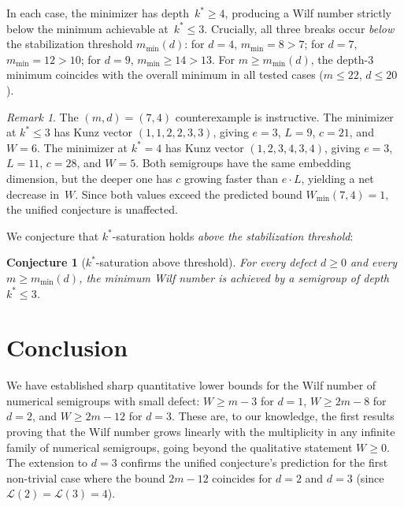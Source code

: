 \documentclass[11pt]{amsart}
\newtheorem{conjecture}[theorem]{Conjecture}
\theoremstyle{definition}
\theoremstyle{remark}
\newtheorem{remark}[theorem]{Remark}
\begin{document}
In each case, the minimizer has depth~$k^* \ge 4$, producing a Wilf number
strictly below the minimum achievable at~$k^* \le 3$.
Crucially, all three breaks occur \emph{below} the stabilization threshold
$m_{\min}(d)$: for $d = 4$, $m_{\min} = 8 > 7$; for $d = 7$,
$m_{\min} = 12 > 10$; for $d = 9$, $m_{\min} \ge 14 > 13$.
For $m \ge m_{\min}(d)$, the depth-$3$ minimum coincides with the overall
minimum in all tested cases ($m \le 22$, $d \le 20$).

\begin{remark}
The $(m,d) = (7,4)$ counterexample is instructive.
The minimizer at $k^* \le 3$ has Kunz vector $(1,1,2,2,3,3)$,
giving $e = 3$, $L = 9$, $c = 21$, and $W = 6$.
The minimizer at $k^* = 4$ has Kunz vector $(1,2,3,4,3,4)$,
giving $e = 3$, $L = 11$, $c = 28$, and $W = 5$.
Both semigroups have the same embedding dimension,
but the deeper one has $c$ growing faster than $e \cdot L$,
yielding a net decrease in~$W$.
Since both values exceed the predicted bound $W_{\min}(7,4) = 1$,
the unified conjecture is unaffected.
\end{remark}

We conjecture that $k^*$-saturation holds \emph{above the stabilization threshold}:

\begin{conjecture}[$k^*$-saturation above threshold]\label{conj:sat}
For every defect $d \ge 0$ and every $m \ge m_{\min}(d)$,
the minimum Wilf number is achieved by a semigroup of depth~$k^* \le 3$.
\end{conjecture}

\section{Conclusion}\label{sec:conclusion}

We have established sharp quantitative lower bounds for the Wilf number
of numerical semigroups with small defect:
$W \ge m - 3$ for $d = 1$, $W \ge 2m - 8$ for $d = 2$,
and $W \ge 2m - 12$ for $d = 3$.
These are, to our knowledge, the first results proving that the Wilf number
grows linearly with the multiplicity in any infinite family of numerical
semigroups, going beyond the qualitative statement $W \ge 0$.
The extension to $d = 3$ confirms the unified conjecture's prediction
for the first non-trivial case where the bound $2m - 12$ coincides for
$d = 2$ and $d = 3$ (since $\mathcal{L}(2) = \mathcal{L}(3) = 4$).
\end{document}
